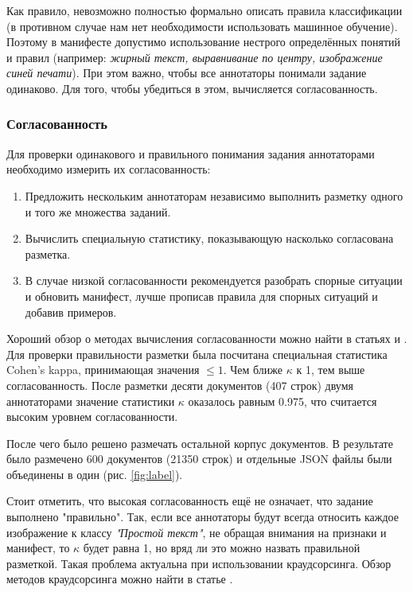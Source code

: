         Как правило, невозможно полностью формально описать правила классификации (в противном случае нам нет необходимости использовать машинное обучение). 
        Поэтому в манифесте допустимо использование нестрого определённых понятий  и правил (например: \textit{жирный текст, выравнивание по центру, изображение синей печати}). При этом важно, чтобы все аннотаторы понимали задание одинаково. Для того, чтобы убедиться в этом, вычисляется согласованность. 
        
    \subsubsection{Согласованность}
        Для проверки одинакового и правильного понимания задания аннотаторами необходимо измерить их согласованность:
        \begin{enumerate}
            \item Предложить нескольким аннотаторам независимо выполнить разметку одного и того же множества заданий. 
            \item Вычислить специальную статистику, показывающую насколько согласована разметка. 
            \item В случае низкой согласованности рекомендуется разобрать спорные ситуации и обновить манифест,
            лучше прописав правила для спорных ситуаций и добавив примеров. 
        \end{enumerate}
        Хороший обзор о методах вычисления согласованности можно найти в статьях
        \cite{artstein2008inter} и \cite{bayerl2011determines}.
        Для проверки правильности разметки была посчитана специальная статистика Cohen's kappa, принимающая значения $\leq 1$. Чем ближе $\kappa$ к 1, тем выше согласованность. После разметки десяти документов (407 строк) двумя аннотаторами значение статистики $\kappa$ оказалось равным 0.975, что считается высоким уровнем согласованности. 
        
        После чего было решено размечать остальной корпус документов. В результате было размечено 600 документов (21350 строк) и отдельные JSON файлы были объединены в один (рис. \ref{fig:label}).
        
        Стоит отметить, что высокая согласованность ещё не означает, что задание выполнено "правильно".
        Так, если все аннотаторы будут всегда относить каждое изображение к классу \textit{"Простой текст"}, не обращая внимания на признаки и манифест, то 
        $\kappa$ будет равна 1, но вряд ли это можно назвать правильной разметкой. Такая проблема актуальна при
        использовании краудсорсинга. Обзор методов краудсорсинга можно найти в статье \cite{gilyzevTurdakov2018}. 